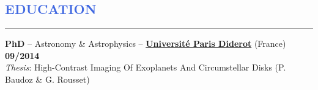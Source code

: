 \documentclass[11pt]{article}
\begin{document}


%


\vspace{-0.25cm}
\textcolor{RoyalBlue}{\section{\large EDUCATION}
\vspace{-0.35cm}\hrule}
\vspace{0.4cm}

\textbf{PhD} -- Astronomy \& Astrophysics --
\href{https://www.univ-paris-diderot.fr/}{\textbf{Universit\'e Paris Diderot}} (France)
\hfill  { \bf 09/2014}\\
{\small
\null \hspace{0.6cm}
{\it Thesis}: High-Contrast Imaging Of Exoplanets And Circumstellar Disks (P. Baudoz \& G. Rousset)}\\
\end{document}
